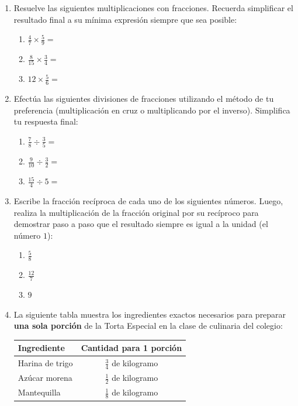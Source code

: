 \documentclass[12pt, letterpaper]{article}
\begin{document}
	\begin{enumerate}[itemsep=0.8cm]
		
		\item Resuelve las siguientes multiplicaciones con fracciones. Recuerda simplificar el resultado final a su mínima expresión siempre que sea posible:
		\begin{enumerate}[label=\alph*., itemsep=0.3cm, topsep=0.2cm]
			\item $\frac{4}{7} \times \frac{5}{9} =$
			\item $\frac{8}{15} \times \frac{3}{4} =$
			\item $12 \times \frac{5}{6} =$
		\end{enumerate}
		
		\item Efectúa las siguientes divisiones de fracciones utilizando el método de tu preferencia (multiplicación en cruz o multiplicando por el inverso). Simplifica tu respuesta final:
		\begin{enumerate}[label=\alph*., itemsep=0.3cm, topsep=0.2cm]
			\item $\frac{7}{8} \div \frac{3}{5} =$
			\item $\frac{9}{10} \div \frac{3}{2} =$
			\item $\frac{15}{4} \div 5 =$
		\end{enumerate}
		
		\item Escribe la fracción recíproca de cada uno de los siguientes números. Luego, realiza la multiplicación de la fracción original por su recíproco para demostrar paso a paso que el resultado siempre es igual a la unidad (el número $1$):
		\begin{enumerate}[label=\alph*., itemsep=0.4cm, topsep=0.2cm]
			\item $\frac{5}{8}$
			\item $\frac{12}{7}$
			\item $9$
		\end{enumerate}
		
		\item La siguiente tabla muestra los ingredientes exactos necesarios para preparar \textbf{una sola porción} de la Torta Especial en la clase de culinaria del colegio:
		
		\begin{table}[h]
			\centering
			\begin{tabular}{lc}
				\toprule
				\textbf{Ingrediente} & \textbf{Cantidad para 1 porción} \\
				\midrule
				Harina de trigo & $\frac{3}{4}$ de kilogramo \\[0.2cm]
				Azúcar morena & $\frac{1}{2}$ de kilogramo \\[0.2cm]
				Mantequilla & $\frac{1}{8}$ de kilogramo \\
				\bottomrule
			\end{tabular}
		\end{table}
		

\end{enumerate}
\end{document}
